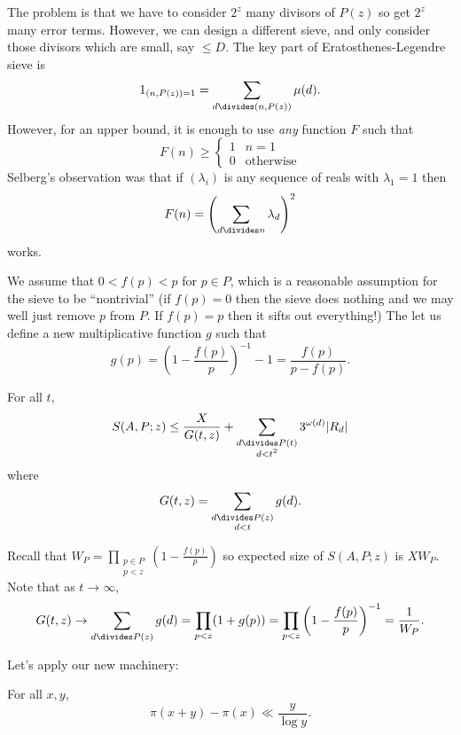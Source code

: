 \documentclass[a4paper]{article}
\theoremstyle{definition}
\begin{document}
The problem is that we have to consider \(2^z\) many divisors of \(P(z)\) so get \(2^z\) many error terms. However, we can design a different sieve, and only consider those divisors which are small, say \(\leq D\). The key part of Eratosthenes-Legendre sieve is
\[
  1_{(n, P(z)) = 1} = \sum_{d \divides (n, P(z))} \mu(d).
\]
However, for an upper bound, it is enough to use \emph{any} function \(F\) such that
\[
  F(n) \geq
  \begin{cases}
    1 & n = 1 \\
    0 & \text{otherwise}
  \end{cases}
\]
Selberg's observation was that if \((\lambda_i)\) is any sequence of reals with \(\lambda_1 = 1\) then
\[
  F(n) = \left( \sum_{d \divides n} \lambda_d \right)^2
\]
works.

We assume that \(0 < f(p) < p\) for \(p \in P\), which is a reasonable assumption for the sieve to be ``nontrivial'' (if \(f(p) = 0\) then the sieve does nothing and we may well just remove \(p\) from \(P\). If \(f(p) = p\) then it sifts out everything!) The let us define a new multiplicative function \(g\) such that
\[
  g(p) = \left( 1 - \frac{f(p)}{p} \right)^{-1} - 1 = \frac{f(p)}{p - f(p)}.
\]

\begin{theorem}
  \label{thm:Selberg's sieve}
  For all \(t\),
  \[
    S(A, P; z) \leq \frac{X}{G(t, z)} + \sum_{\substack{d \divides P(t) \\ d < t^2}} 3^{\omega(d)} |R_d|
  \]
  where
  \[
    G(t, z) = \sum_{\substack{d \divides P(z) \\ d < t}} g(d).
  \]
\end{theorem}

Recall that \(W_P = \prod_{\substack{p \in P \\ p < z}} (1 - \frac{f(p)}{p})\) so expected size of \(S(A, P; z)\) is \(XW_P\). Note that as \(t \to \infty\),
\[
  G(t, z)
  \to \sum_{d \divides P(z)} g(d)
  = \prod_{p < z} (1 + g(p))
  = \prod_{p < z} \left( 1 - \frac{f(p)}{p} \right)^{-1}
  = \frac{1}{W_P}.
\]

Let's apply our new machinery:
\begin{corollary}
  For all \(x, y\),
  \[
    \pi(x + y) - \pi(x) \ll \frac{y}{\log y}.
  \]
\end{corollary}
\end{document}
